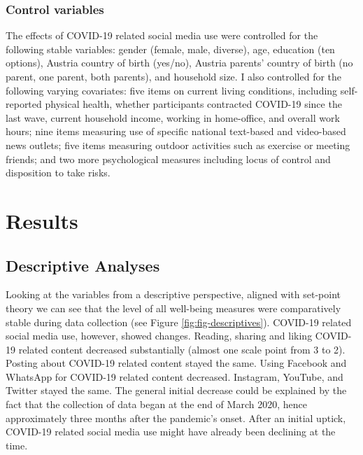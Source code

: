 \documentclass[
  man,mask,floatsintext]{apa7}
\begin{document}
\subsubsection{Control variables}\label{control-variables}

The effects of COVID-19 related social media use were controlled for the following stable variables:
gender (female, male, diverse), age, education (ten options), Austria country of birth (yes/no), Austria parents' country of birth (no parent, one parent, both parents), and household size.
I also controlled for the following varying covariates: five items on current living conditions, including self-reported physical health, whether participants contracted COVID-19 since the last wave, current household income, working in home-office, and overall work hours; nine items measuring use of specific national text-based and video-based news outlets; five items measuring outdoor activities such as exercise or meeting friends; and two more psychological measures including locus of control and disposition to take risks.

\section{Results}\label{results}

\subsection{Descriptive Analyses}\label{descriptive-analyses}

Looking at the variables from a descriptive perspective, aligned with set-point theory we can see that the level of all well-being measures were comparatively stable during data collection (see Figure \ref{fig:fig-descriptives}).
COVID-19 related social media use, however, showed changes.
Reading, sharing and liking COVID-19 related content decreased substantially (almost one scale point from 3 to 2).
Posting about COVID-19 related content stayed the same.
Using Facebook and WhatsApp for COVID-19 related content decreased.
Instagram, YouTube, and Twitter stayed the same.
The general initial decrease could be explained by the fact that the collection of data began at the end of March 2020, hence approximately three months after the pandemic's onset.
After an initial uptick, COVID-19 related social media use might have already been declining at the time.
\end{document}
